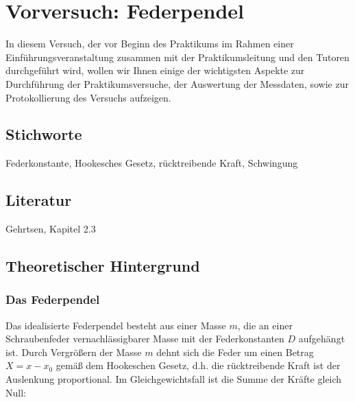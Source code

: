 \chapter*{Vorversuch: Federpendel}
\label{v:0}

In diesem Versuch, der vor Beginn des Praktikums im Rahmen einer Einführungsveranstaltung zusammen mit der Praktikumsleitung und den Tutoren durchgeführt wird, wollen wir Ihnen einige der wichtigsten Aspekte zur Durchführung der Praktikumsversuche, der Auswertung der Messdaten, sowie zur Protokollierung des Versuchs aufzeigen.
\section{Stichworte}

Federkonstante, Hookesches Gesetz, rücktreibende Kraft, Schwingung
%
\section{Literatur}

Gehrtsen, Kapitel 2.3
%

\section{Theoretischer Hintergrund}

\subsection{Das Federpendel}

Das idealisierte Federpendel besteht aus einer Masse $m$, die an einer Schraubenfeder vernachlässigbarer Masse mit der Federkonstanten $D$ aufgehängt ist. Durch Vergrößern der Masse $m$ dehnt sich die Feder um einen Betrag $X=x-x_0$ gemäß dem Hookeschen Gesetz, d.h. die rücktreibende Kraft ist der Auslenkung proportional. Im Gleichgewichtsfall ist die Summe der Kräfte gleich Null:

